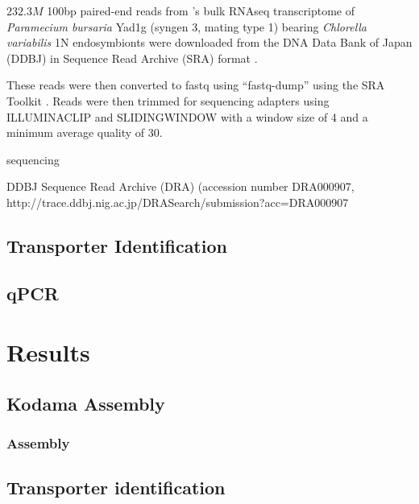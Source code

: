 \(232.3M\) 100bp paired-end reads from \citep{Kodama2014}'s 
bulk RNAseq transcriptome of \textit{Paramecium bursaria} Yad1g (syngen
3, mating type 1) bearing \textit{Chlorella variabilis} 1N endosymbionts
were downloaded from the DNA Data Bank of Japan (DDBJ) \citep{Tateno2002,Kaminuma2011}
in Sequence Read Archive (SRA) format \citep{Leinonen2011,KodamaNRA2012b}. 

These reads were then converted to fastq using ``fastq-dump'' using the SRA Toolkit
\citep{NationalCenterforBiotechnologyInformation2011}.  Reads were then trimmed
for sequencing adapters using ILLUMINACLIP and SLIDINGWINDOW with a window size
of 4 and a minimum average quality of 30.













sequencing


DDBJ Sequence Read Archive (DRA) (accession number DRA000907, http://trace.ddbj.nig.ac.jp/DRASearch/submission?acc=DRA000907



\subsection{Transporter Identification}

\subsection{qPCR}


\section{Results}


\subsection{Kodama Assembly}



\subsubsection{Assembly}



\subsection{Transporter identification}

